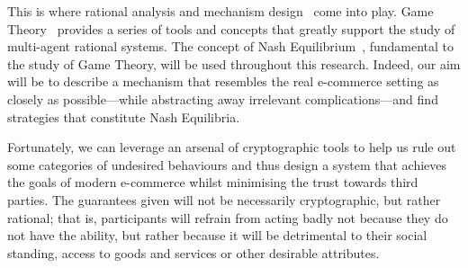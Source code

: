   This is where rational analysis and mechanism design~\cite{nisan2007algorithmic} come
  into play. Game Theory~\cite{leyton2008essentials} provides a series of tools and
  concepts that greatly support the study of multi-agent rational systems. The concept of
  Nash Equilibrium~\cite{nasheqcomp}, fundamental to the study of Game Theory, will be
  used throughout this research. Indeed, our aim will be to describe a mechanism that
  resembles the real e-commerce setting as closely as possible---while abstracting away
  irrelevant complications---and find strategies that constitute Nash Equilibria.

  Fortunately, we can leverage an arsenal of cryptographic tools to help us rule out some
  categories of undesired behaviours and thus design a system that achieves the goals of
  modern e-commerce whilst minimising the trust towards third parties. The guarantees
  given will not be necessarily cryptographic, but rather rational; that is, participants
  will refrain from acting badly not because they do not have the ability, but rather
  because it will be detrimental to their social standing, access to goods and services or
  other desirable attributes.
